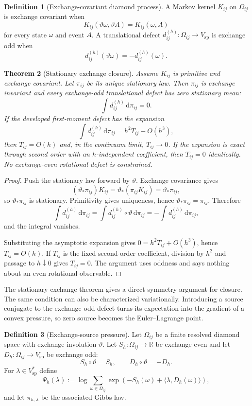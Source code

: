 \documentclass[11pt]{article}
\newtheorem{theorem}{Theorem}[section]
\theoremstyle{definition}
\newtheorem{definition}[theorem]{Definition}
\theoremstyle{remark}
\newcommand{\R}{\mathbb R}
\newcommand{\dd}{\mathrm d}
\newcommand{\spat}{\mathrm{sp}}
\begin{document}
\begin{definition}[Exchange-covariant diamond process]
\label{def:diamond-process}
A Markov kernel $K_{ij}$ on $\Omega_{ij}$ is exchange covariant when
\[
 K_{ij}(\vartheta\omega,\vartheta A)=K_{ij}(\omega,A)
\]
for every state $\omega$ and event $A$.  A translational defect
$d_{ij}^{(h)}:\Omega_{ij}\to V_{\spat}$ is exchange odd when
\[
 d_{ij}^{(h)}(\vartheta\omega)=-d_{ij}^{(h)}(\omega).
\]
\end{definition}

\begin{theorem}[Stationary exchange closure]
\label{thm:exchange-closure}
Assume $K_{ij}$ is primitive and exchange covariant.  Let $\pi_{ij}$ be its
unique stationary law.  Then $\pi_{ij}$ is exchange invariant and every
exchange-odd translational defect has zero stationary mean:
\[
 \int d_{ij}^{(h)}\,\dd\pi_{ij}=0.
\]
If the developed first-moment defect has the expansion
\[
 \int d_{ij}^{(h)}\,\dd\pi_{ij}
 =h^2T_{ij}+O(h^3),
\]
then $T_{ij}=O(h)$ and, in the continuum limit, $T_{ij}\to0$.  If the expansion
is exact through second order with an $h$-independent coefficient, then
$T_{ij}=0$ identically.  No exchange-even rotational defect is constrained.
\end{theorem}

\begin{proof}
Push the stationary law forward by $\vartheta$.  Exchange covariance gives
\[
 (\vartheta_*\pi_{ij})K_{ij}
 =\vartheta_*(\pi_{ij}K_{ij})
 =\vartheta_*\pi_{ij},
\]
so $\vartheta_*\pi_{ij}$ is stationary.  Primitivity gives uniqueness, hence
$\vartheta_*\pi_{ij}=\pi_{ij}$.  Therefore
\[
 \int d_{ij}^{(h)}\,\dd\pi_{ij}
 =\int d_{ij}^{(h)}\circ\vartheta\,\dd\pi_{ij}
 =-\int d_{ij}^{(h)}\,\dd\pi_{ij},
\]
and the integral vanishes.

Substituting the asymptotic expansion gives
$0=h^2T_{ij}+O(h^3)$, hence $T_{ij}=O(h)$.  If $T_{ij}$ is the fixed
second-order coefficient, division by $h^2$ and passage to $h\downarrow0$
gives $T_{ij}=0$.  The argument uses oddness and says nothing about an
even rotational observable.
\end{proof}

The stationary exchange theorem gives a direct symmetry argument for closure.
The same condition can also be characterized variationally.  Introducing a source
conjugate to the exchange-odd defect turns its expectation into the gradient of a
convex pressure, so zero source becomes the Euler--Lagrange point.

\begin{definition}[Exchange-source pressure]
\label{def:exchange-source-pressure}
Let $\Omega_{ij}$ be a finite resolved diamond space with exchange involution
$\vartheta$.  Let $S_h:\Omega_{ij}\to\R$ be exchange even and let
$D_h:\Omega_{ij}\to V_{\spat}$ be exchange odd:
\[
 S_h\circ\vartheta=S_h,
 \qquad D_h\circ\vartheta=-D_h.
\]
For $\lambda\in V_{\spat}^*$ define
\[
 \Psi_h(\lambda)
 :=\log\sum_{\omega\in\Omega_{ij}}
 \exp\!\left(-S_h(\omega)+\langle\lambda,D_h(\omega)\rangle\right),
\]
and let $\pi_{h,\lambda}$ be the associated Gibbs law.
\end{definition}
\end{document}
